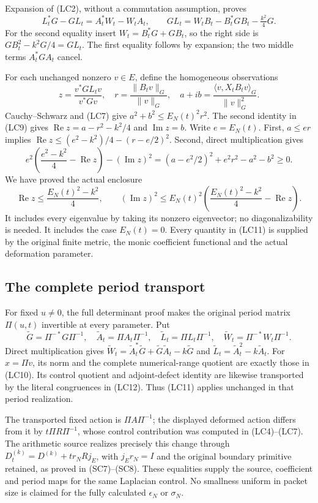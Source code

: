 Expansion of (LC2), without a commutation assumption, proves
\[
 L_t^*G-GL_t=A_t^*W_t-W_tA_t,\qquad
 GL_t=W_tB_t-B_t^*GB_t-\tfrac{k^2}{4}G.
 \tag{LC9}
\]
For the second equality insert
\(W_t=B_t^*G+GB_t\), so the right side is
\(GB_t^2-k^2G/4=GL_t\). The first equality follows by expansion;
the two middle terms \(A_t^*GA_t\) cancel.

For each unchanged nonzero \(v\in E\), define the homogeneous
observations
\[
 z=\frac{v^*GL_tv}{v^*Gv},\quad
 r=\frac{\|B_tv\|_G}{\|v\|_G},\quad
 a+ib=\frac{\langle v,X_tB_tv\rangle_G}{\|v\|_G^2}.
 \tag{LC10}
\]
Cauchy--Schwarz and (LC7) give
\(a^2+b^2\le E_N(t)^2r^2\). The second identity in (LC9) gives
\(\operatorname{Re}z=a-r^2-k^2/4\) and
\(\operatorname{Im}z=b\). Write \(e=E_N(t)\). First,
\(a\le er\) implies
\(\operatorname{Re}z\le(e^2-k^2)/4-(r-e/2)^2\).
Second, direct multiplication gives
\[
 e^2\left(\frac{e^2-k^2}{4}-\operatorname{Re}z\right)
    -(\operatorname{Im}z)^2
   =(a-e^2/2)^2+e^2r^2-a^2-b^2\ge0.
\]
We have proved the actual enclosure
\[
 \boxed{\operatorname{Re}z\le\frac{E_N(t)^2-k^2}{4},\qquad
 (\operatorname{Im}z)^2\le E_N(t)^2
       \left(\frac{E_N(t)^2-k^2}{4}-\operatorname{Re}z\right).}
 \tag{LC11}
\]
It includes every eigenvalue by taking its nonzero eigenvector;
no diagonalizability is needed. It includes the case \(E_N(t)=0\).
Every quantity in (LC11) is supplied by the original finite metric,
the monic coefficient functional and the actual deformation parameter.

\subsection{The complete period transport}

For fixed \(u\ne0\), the full determinant proof makes the original
period matrix \(\Pi(u,t)\) invertible at every parameter. Put
\[
 \widetilde G=\Pi^{-*}G\Pi^{-1},\quad
 \widetilde A_t=\Pi A_t\Pi^{-1},\quad
 \widetilde L_t=\Pi L_t\Pi^{-1},\quad
 \widetilde W_t=\Pi^{-*}W_t\Pi^{-1}.
 \tag{LC12}
\]
Direct multiplication gives
\(\widetilde W_t=\widetilde A_t^*\widetilde G+
\widetilde G\widetilde A_t-k\widetilde G\) and
\(\widetilde L_t=\widetilde A_t^2-k\widetilde A_t\).
For \(x=\Pi v\), its norm and the complete numerical-range quotient
are exactly those in (LC10). Its control quotient and adjoint-defect
identity are likewise transported by the literal congruences in
(LC12). Thus (LC11) applies unchanged in that period realization.

The transported fixed action is \(\Pi A\Pi^{-1}\); the displayed
deformed action differs from it by \(t\Pi R\Pi^{-1}\), whose
control contribution was computed in (LC4)--(LC7). The arithmetic
source realizes precisely this change through
\(D_t^{(k)}=D^{(k)}+t r_NRj_E\), with
\(j_Er_N=I\) and the original boundary primitive retained, as
proved in (SC7)--(SC8). These equalities supply the source,
coefficient and period maps for the same Laplacian control.
No smallness uniform in packet size is claimed for the fully
calculated \(\epsilon_N\) or \(\sigma_N\).
